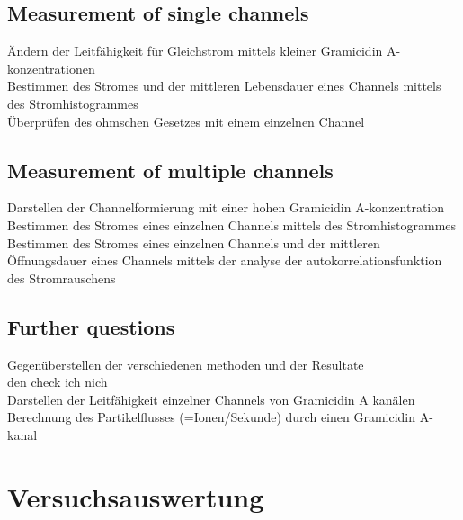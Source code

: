 \documentclass{include/thesisclass3}
\begin{document}
\section{Measurement of single channels}
Ändern der Leitfähigkeit für Gleichstrom mittels kleiner Gramicidin A-konzentrationen\\

Bestimmen des Stromes und der mittleren Lebensdauer eines Channels mittels des Stromhistogrammes\\

Überprüfen des ohmschen Gesetzes mit einem einzelnen Channel\\

\section{Measurement of multiple channels}

Darstellen der Channelformierung mit einer hohen Gramicidin A-konzentration\\

Bestimmen des Stromes eines einzelnen Channels mittels des Stromhistogrammes\\

Bestimmen des Stromes eines einzelnen Channels und der mittleren Öffnungsdauer eines Channels mittels der analyse der autokorrelationsfunktion des Stromrauschens

\section{Further questions}

Gegenüberstellen der verschiedenen methoden und der Resultate\\

den check ich nich\\

Darstellen der Leitfähigkeit einzelner Channels von Gramicidin A kanälen\\

Berechnung des Partikelflusses (=Ionen/Sekunde) durch einen Gramicidin A-kanal



\chapter{Versuchsauswertung}
\end{document}

